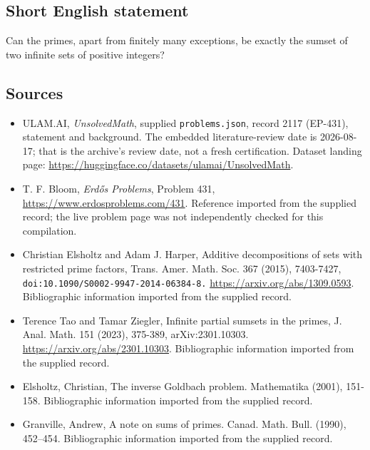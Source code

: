 \documentclass[11pt,a4paper]{article}
\begin{document}
\subsection{Short English statement}

Can the primes, apart from finitely many exceptions, be exactly the sumset of two infinite sets of positive integers?

\subsection{Sources}

{\small

\begin{itemize}

\item[\hypertarget{source:2117:1}{S1}] ULAM.AI, \emph{UnsolvedMath}, supplied \texttt{problems.json}, record 2117 (EP-431), statement and background. The embedded literature-review date is 2026-08-17; that is the archive’s review date, not a fresh certification. Dataset landing page: \url{https://huggingface.co/datasets/ulamai/UnsolvedMath}.

\item[\hypertarget{source:2117:2}{S2}] T. F. Bloom, \emph{Erdős Problems}, Problem 431, \url{https://www.erdosproblems.com/431}. Reference imported from the supplied record; the live problem page was not independently checked for this compilation.

\item[\hypertarget{source:2117:3}{S3}] Christian Elsholtz and Adam J. Harper, Additive decompositions of sets with restricted prime factors, Trans. Amer. Math. Soc. 367 (2015), 7403-7427, \nolinkurl{doi:10.1090/S0002-9947-2014-06384-8.} \url{https://arxiv.org/abs/1309.0593}. Bibliographic information imported from the supplied record.

\item[\hypertarget{source:2117:4}{S4}] Terence Tao and Tamar Ziegler, Infinite partial sumsets in the primes, J. Anal. Math. 151 (2023), 375-389, arXiv:2301.10303. \url{https://arxiv.org/abs/2301.10303}. Bibliographic information imported from the supplied record.

\item[\hypertarget{source:2117:5}{S5}] Elsholtz, Christian, The inverse Goldbach problem. Mathematika (2001), 151-158. Bibliographic information imported from the supplied record.

\item[\hypertarget{source:2117:6}{S6}] Granville, Andrew, A note on sums of primes. Canad. Math. Bull. (1990), 452--454. Bibliographic information imported from the supplied record.

\end{itemize}

}

\label{end:2117}
\end{document}
